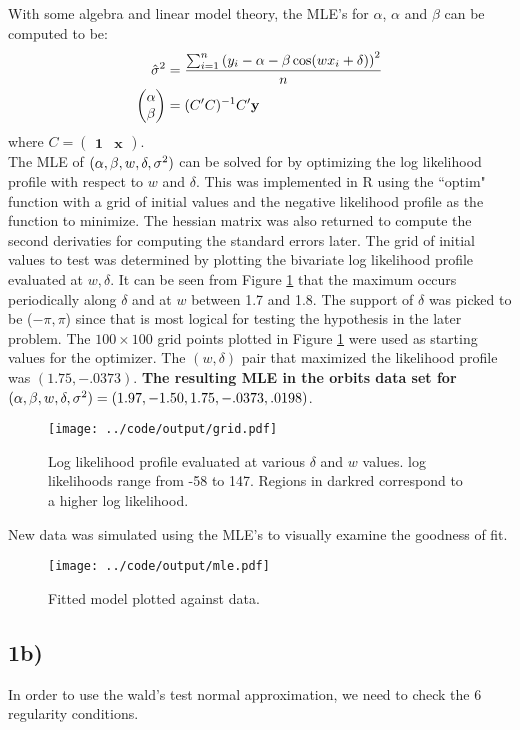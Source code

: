 \documentclass[11pt]{article}
\def\beginmyfig{\begin{figure}[H]\center} %
\def\endmyfig{\end{figure}}
\newcommand{\p}[1]{\left(#1\right)}
\begin{document}
\noindent
With some algebra and linear model theory, the MLE's for $\alpha$, $\alpha$ and $\beta$ can be computed to be:
\[
\begin{aligned}
  \hat\sigma^2 &= \frac{\suml\p{y_i-\hi}^2}{n}\\
  \begin{pmatrix} \alpha\\\beta\\ \end{pmatrix} &= (C'C)^{-1}C'\mathbf y
\end{aligned}
\]
\noindent where $C=\begin{pmatrix}\mathbf 1 & \mathbf x\end{pmatrix}$.\\

\noindent The MLE of $(\alpha,\beta,w,\delta,\sigma^2)$ can be solved for by optimizing the log
likelihood profile with respect to $w$ and $\delta$. This was implemented in R
using the ``optim" function with a grid of initial values and the negative
likelihood profile as the function to minimize. The hessian matrix was also
returned to compute the second derivaties for computing the standard errors
later. The grid of initial values to test was determined by plotting the
bivariate log likelihood profile evaluated at $w,\delta$. It can be seen from
Figure \ref{fig:grid} that the maximum occurs periodically along $\delta$ and
at $w$ between 1.7 and 1.8. The support of $\delta$ was picked to be
($-\pi,\pi$) since that is most logical for testing the hypothesis in the later
problem. The $100 \times 100$ grid points plotted in Figure \ref{fig:grid} were used as
starting values for the optimizer. The $(w,\delta)$ pair that maximized the
likelihood profile was $(1.75, -.0373)$. \textbf{The resulting MLE in the
orbits data set for} $(\alpha,\beta,w,\delta,\sigma^2)=(1.97,-1.50, 1.75, -.0373, .0198)$.

\beginmyfig
  \texttt{[image: ../code/output/grid.pdf]}
  \caption{\small Log likelihood profile evaluated at various $\delta$ and $w$ values. log likelihoods range from -58 to 147. Regions in darkred correspond to a higher log likelihood.}
  \label{fig:grid}
\endmyfig

\noindent
New data was simulated using the MLE's to visually examine the goodness of fit.

\beginmyfig
  \texttt{[image: ../code/output/mle.pdf]}
  \caption{\small Fitted model plotted against data.}
  \label{fig:mle}
\endmyfig

\subsection*{1b)}
In order to use the wald's test normal approximation, we need to check the 6 regularity conditions. 
\end{document}
